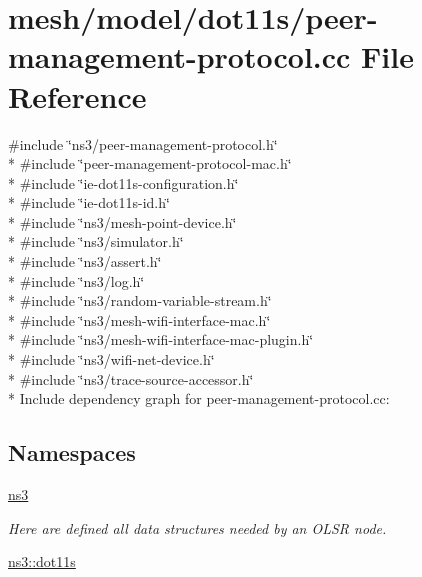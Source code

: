 \hypertarget{peer-management-protocol_8cc}{}\section{mesh/model/dot11s/peer-\/management-\/protocol.cc File Reference}
\label{peer-management-protocol_8cc}
{\ttfamily \#include \char`\"{}ns3/peer-\/management-\/protocol.\+h\char`\"{}}\\*
{\ttfamily \#include \char`\"{}peer-\/management-\/protocol-\/mac.\+h\char`\"{}}\\*
{\ttfamily \#include \char`\"{}ie-\/dot11s-\/configuration.\+h\char`\"{}}\\*
{\ttfamily \#include \char`\"{}ie-\/dot11s-\/id.\+h\char`\"{}}\\*
{\ttfamily \#include \char`\"{}ns3/mesh-\/point-\/device.\+h\char`\"{}}\\*
{\ttfamily \#include \char`\"{}ns3/simulator.\+h\char`\"{}}\\*
{\ttfamily \#include \char`\"{}ns3/assert.\+h\char`\"{}}\\*
{\ttfamily \#include \char`\"{}ns3/log.\+h\char`\"{}}\\*
{\ttfamily \#include \char`\"{}ns3/random-\/variable-\/stream.\+h\char`\"{}}\\*
{\ttfamily \#include \char`\"{}ns3/mesh-\/wifi-\/interface-\/mac.\+h\char`\"{}}\\*
{\ttfamily \#include \char`\"{}ns3/mesh-\/wifi-\/interface-\/mac-\/plugin.\+h\char`\"{}}\\*
{\ttfamily \#include \char`\"{}ns3/wifi-\/net-\/device.\+h\char`\"{}}\\*
{\ttfamily \#include \char`\"{}ns3/trace-\/source-\/accessor.\+h\char`\"{}}\\*
Include dependency graph for peer-\/management-\/protocol.cc\+:
\subsection*{Namespaces}
\begin{DoxyCompactItemize}
\item 
 \hyperlink{namespacens3}{ns3}
\begin{DoxyCompactList}\small\item\em Here are defined all data structures needed by an O\+L\+SR node. \end{DoxyCompactList}\item 
 \hyperlink{namespacens3_1_1dot11s}{ns3\+::dot11s}
\end{DoxyCompactItemize}
